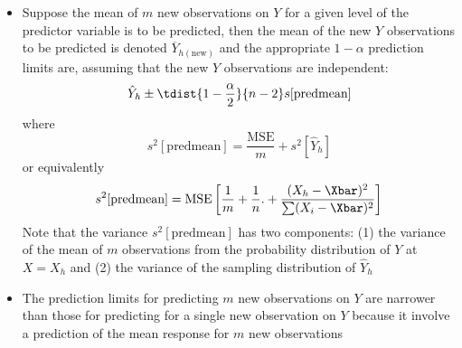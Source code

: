 \begin{itemize}
\item Suppose the mean of $m$ new observations on $Y$ for a given level of the predictor variable is to be predicted, then the mean of the new $Y$ observations to be predicted is denoted $\overline{Y}_{h(\text{new})}$ and the appropriate $1-\alpha$ prediction limits are, assuming that the new $Y$ observations are independent: $$ \hat{Y}_h \pm \tdist{1 - \frac{\alpha}{2}}{n-2}s[\text{predmean}] $$ where $$ s^2[\text{predmean}] = \frac{\text{MSE}}{m} + s^2[\hat{Y}_h] $$ or equivalently $$ s^2[\text{predmean}] = \text{MSE}\left[ \frac{1}{m} + \frac{1}{n}. + \frac{(X_h - \Xbar)^2}{\sum (X_i - \Xbar)^2}\right] $$ Note that the variance $s^2[\text{predmean}]$ has two components: (1) the variance of the mean of $m$ observations from the probability distribution of $Y$ at $X=X_h$ and (2) the variance of the sampling distribution of $\hat{Y}_h$ 
\item The prediction limits for predicting $m$ new observations on $Y$ are narrower than those for predicting for a single new observation on $Y$ because it involve a prediction of the mean response for $m$ new observations
\end{itemize}

